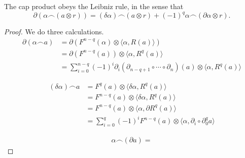\documentclass[main.tex]{subfiles}
\begin{document}
\begin{lemma}
  \label{lemma:cap_product_leibniz_rule}
  The cap product obeys the Leibniz rule, in the sense that
  \begin{equation*}
    \partial(\alpha \frown (a \otimes r)) = (\delta \alpha) \frown (a \otimes r) + (-1)^{q} \alpha \frown (\partial \alpha \otimes r).
  \end{equation*}
\end{lemma}
\begin{proof}
  We do three calculations.
  \begin{align*}
    \partial( \alpha \frown a ) &= \partial(F^{n-q}(\alpha) \otimes \langle \alpha, R(a) \rangle) \\
    &= \partial(F^{n-q}(a)) \otimes \langle \alpha, R^{q}(a) \rangle \\
    &= \sum_{i = 0}^{n-q} (-1)^{i} \partial_{i} (\partial_{n-q+1} \circ \cdots \circ \partial_{n})(a) \otimes\langle \alpha, R^{q}(a) \rangle
  \end{align*}

  \begin{align*}
    (\delta \alpha) \frown a &= F^{q}(a) \otimes \langle \delta \alpha, R^{q}(a) \rangle \\
    &= F^{n-q}(a) \otimes \langle \delta \alpha, R^{q}(a) \rangle \\
    &= F^{n-q}(a) \otimes \langle \alpha, \partial R^{q}(a) \rangle \\
    &= \sum_{i = 0}^{q} (-1)^{i} F^{n-q}(a) \otimes \langle \alpha, \partial_{i} \circ \partial_{0}^{q} a \rangle
  \end{align*}

  \begin{align*}
    \alpha \frown (\partial a) =
  \end{align*}
\end{proof}
\end{document}
